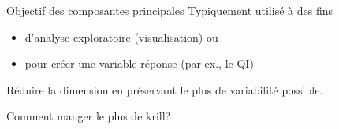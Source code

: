 \documentclass[
  ignorenonframetext,
]{beamer}
\providecommand{\tightlist}{%
  \setlength{\itemsep}{0pt}\setlength{\parskip}{0pt}}\usepackage{longtable,booktabs,array}
\begin{document}
\begin{frame}{Objectif des composantes principales}
\protect\hypertarget{objectif-des-composantes-principales}{}
Typiquement utilisé à des fins

\begin{itemize}
\tightlist
\item
  d'analyse exploratoire (visualisation) ou
\item
  pour créer une variable réponse (par ex., le QI)
\end{itemize}

Réduire la dimension en préservant le plus de variabilité possible.
\end{frame}

\begin{frame}{Comment manger le plus de krill?}
\protect\hypertarget{comment-manger-le-plus-de-krill}{}
\begin{figure}

\begin{minipage}[t]{0.50\linewidth}

{\centering 


}

\end{minipage}%
%
\begin{minipage}[t]{0.50\linewidth}

{\centering 

\raisebox{-\height}{

}}
\end{minipage}
\end{figure}
\end{frame}
\end{document}
